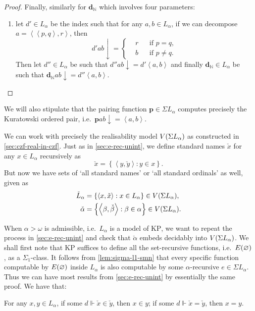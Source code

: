 \documentclass[12pt,openany]{book}
\theoremstyle{plain}
\theoremstyle{definition}
\newcommand\uplabel[1]{\textup{(#1)}}
\newcommand\tuple[1]{\left\langle #1 \right\rangle}
\newcommand\KP{\mathrm{KP}}
\newcommand\bp{\mathbf{p}}
\newcommand\bdN{\mathbf{d}_\mathbb{N}}
\begin{document}
\begin{proof}
  Finally, similarly for $\bdN$ which involves four parameters:
  \begin{enumerate}[label=\uplabel{\roman*},resume]
    \item let $d' \in L_\alpha$ be the index such that for any $a, b \in L_\alpha$, if we can decompose $a = \tuple{\tuple{p, q}, r}$, then
          \[d' ab {\downarrow} = \left\{\begin{aligned}
               & r &  & \text{if $p = q$},    \\
               & b &  & \text{if $p \neq q$}.
            \end{aligned}\right.\]
          Then let $d'' \in L_\alpha$ be such that $d'' ab {\downarrow} = d' \tuple{a, b}$ and finally $\bdN \in L_\alpha$ be such that $\bdN ab {\downarrow} = d'' \tuple{a, b}$. \qedhere
  \end{enumerate}
\end{proof}

We will also stipulate that the pairing function $\bp \in \Sigma L_\alpha$ computes precisely the Kuratowski ordered pair, i.e.\ $\bp ab {\downarrow} = \tuple{a, b}$.

We can work with precisely the realisability model $V\mleft(\Sigma L_\alpha\mright)$ as constructed in \autoref{sec:czf-real-in-czf}. Just as in \autoref{sec:e-rec-unint}, we define standard names $\check{x}$ for any $x \in L_\alpha$ recursively as
\[\check{x} = \left\{\tuple{y, \check{y}} : y \in x\right\}.\]
But now we have sets of `all standard names' or `all standard ordinals' as well, given as
\begin{align*}
  \check{L}_\alpha & = \left\{\tuple{x, \check{x}} : x \in L_\alpha\right\} \in V\mleft(\Sigma L_\alpha\mright),           \\
  \check{\alpha}   & = \left\{\tuple{\beta, \check{\beta}} : \beta \in \alpha\right\} \in V\mleft(\Sigma L_\alpha\mright).
\end{align*}

When $\alpha > \omega$ is admissible, i.e.\ $L_\alpha$ is a model of $\KP$, we want to repeat the process in \autoref{sec:e-rec-unint} and check that $\check{\alpha}$ embeds decidably into $V\mleft(\Sigma L_\alpha\mright)$. We shall first note that $\KP$ suffices to define all the set-recursive functions, i.e.\ $E\mleft(\varnothing\mright)$, as a $\Sigma_1$-class. It follows from \autoref{lem:sigma-l1-smn} that every specific function computable by $E\mleft(\varnothing\mright)$ inside $L_\alpha$ is also computable by some $\alpha$-recursive $e \in \Sigma L_\alpha$. Thus we can have most results from \autoref{sec:e-rec-unint} by essentially the same proof. We have that:
\begin{lemma}
  \label{lem:alpha-rec-real-check-name-true}
  For any $x, y \in L_\alpha$, if some $d \Vdash \check{x} \in \check{y}$, then $x \in y$; if some $d \Vdash \check{x} = \check{y}$, then $x = y$.
\end{lemma}
\end{document}
